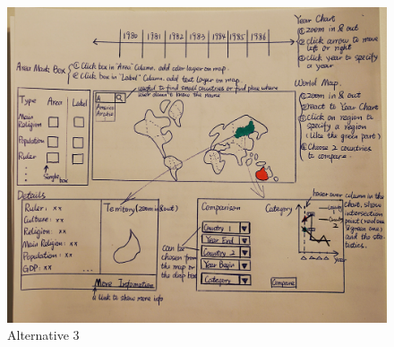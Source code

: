 \documentclass[12pt, fullpage,letterpaper]{article}
\begin{document}
\begin{figure}[h!]
    \begin{center}
        \includegraphics[width=\textwidth]{alternative3.JPG}
        \caption{Alternative 3}
        \label{fig:alt3}
    \end{center}
\end{figure}
\end{document}
